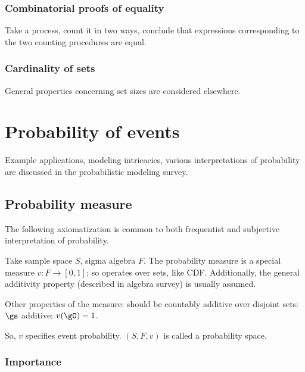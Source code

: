 \documentclass[oneside, article]{memoir}
\begin{document}

\subsection{Combinatorial proofs of equality}
Take a process, count it in two ways, conclude that expressions corresponding to the two counting procedures are equal.

\subsection{Cardinality of sets}
General properties concerning set sizes are considered elsewhere.

\chapter{Probability of events}
Example applications, modeling intricacies, various interpretations of probability are discussed in the probabilistic modeling survey.

\section{Probability measure}
The following axiomatization is common to both frequentist and subjective interpretation of probability.

Take sample space $S$, sigma algebra $F$. The probability measure is a special measure $v:F \to [0,1]$; so operates over sets, like CDF. Additionally, the general additivity property (described in algebra survey) is usually assumed.

Other properties of the measure: should be countably additive over disjoint sets: $\gs$ additive; $v(\gO) = 1$.

So, $v$ specifies event probability. $(S, F, v)$ is called a probability space.

\subsection{Importance}
\end{document}
